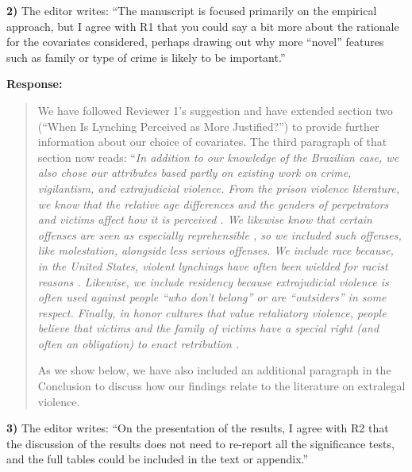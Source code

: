 \documentclass[a4paper,12pt]{article}
\begin{document}
\vspace{.3cm}

\noindent \textbf{2)} The editor writes: ``The manuscript is focused primarily
on the empirical approach, but I agree with R1 that you could say a bit more
about the rationale for the covariates considered, perhaps drawing out why more
``novel'' features such as family or type of crime is likely to be important.'' 

\vspace{.3cm}

\noindent \textbf{Response:} 
\begin{quote}

We have followed Reviewer 1's suggestion and have extended section two (``When
Is Lynching Perceived as More Justified?'')  to provide further information
about our choice of covariates. The third paragraph of that section now reads:
``\textit{In addition to our knowledge of the Brazilian case, we also chose our
attributes based partly on existing work on crime, vigilantism, and
extrajudicial violence. From the prison violence literature, we know that the
relative age differences and the genders of perpetrators and victims affect
how it is perceived \citep{fleisher2009myth}. We likewise know that certain
offenses are seen as especially reprehensible \citep{skarbek2014social}, so
we included such offenses, like molestation, alongside less serious offenses.
We include race because, in the United States, violent lynchings have often
been wielded for racist reasons \citep{dray2003hands}. Likewise, we include
residency because extrajudicial violence is often used against people ``who
don't belong'' or are ``outsiders'' in some respect. Finally, in honor
cultures that value retaliatory violence, people believe that victims and the
family of victims have a special right (and often an obligation) to enact
retribution \citep{weiner2013rule}.}

As we show below, we have also included an additional paragraph in the
Conclusion to discuss how our findings relate to the literature on extralegal
violence.

\end{quote}

\vspace{.3cm}

\noindent \textbf{3)} The editor writes: ``On the presentation of the results,
I agree with R2 that the discussion of the results does not need to re-report
all the significance tests, and the full tables could be included in the text
or appendix.''
\end{document}
